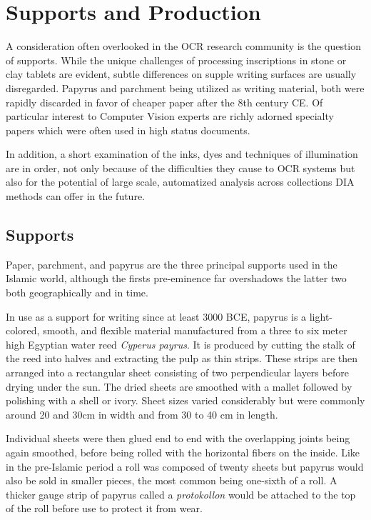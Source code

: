 \section{Supports and Production}

A consideration often overlooked in the OCR research community is the question
of supports. While the unique challenges of processing inscriptions in stone or
clay tablets are evident, subtle differences on supple writing surfaces are
usually disregarded. Papyrus and parchment being utilized as writing
material, both were rapidly discarded in favor of cheaper paper after the 8th
century CE. Of particular interest to Computer Vision experts are richly
adorned specialty papers which were often used in high status documents.

In addition, a short examination of the inks, dyes and techniques of
illumination are in order, not only because of the difficulties they cause to
OCR systems but also for the potential of large scale, automatized analysis
across collections DIA methods can offer in the future.

\subsection{Supports}

Paper, parchment, and papyrus are the three principal supports used in the
Islamic world, although the firsts pre-eminence far overshadows the latter two
both geographically and in time.

In use as a support for writing since at least 3000 BCE, papyrus is a
light-colored, smooth, and flexible material manufactured from a three to six
meter high Egyptian water reed \emph{Cyperus payrus}. It is produced by cutting
the stalk of the reed into halves and extracting the pulp as thin strips.
These strips are then arranged into a rectangular sheet consisting of two
perpendicular layers before drying under the sun. The dried sheets are smoothed
with a mallet followed by polishing with a shell or ivory. Sheet sizes varied
considerably but were commonly around 20 and 30cm in width and from 30 to 40
cm in length.

Individual sheets were then glued end to end with the overlapping joints being
again smoothed, before being rolled with the horizontal fibers on the inside.
Like in the pre-Islamic period a roll was composed of twenty sheets but papyrus
would also be sold in smaller pieces, the most common being one-sixth of a
roll. A thicker gauge strip of papyrus called a \emph{protokollon} would be
attached to the top of the roll before use to protect it from wear.

